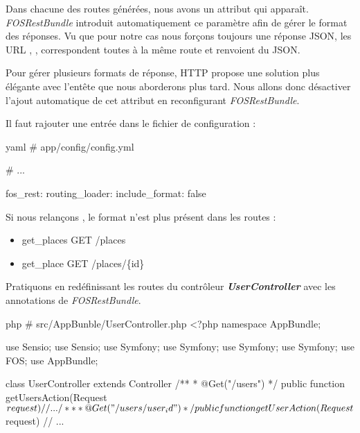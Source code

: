\documentclass[big]{zmdocument}
\begin{document}
Dans chacune des routes générées, nous avons un attribut  qui apparaît. \textit{FOSRestBundle} introduit automatiquement ce paramètre afin de gérer le format des réponses. Vu que pour notre cas nous forçons toujours une réponse JSON, les URL , ,  correspondent toutes à la même route et renvoient du JSON.



Pour gérer plusieurs formats de réponse, HTTP propose une solution plus élégante avec l'entête  que nous aborderons plus tard. Nous allons donc désactiver l'ajout automatique de cet attribut en reconfigurant \textit{FOSRestBundle}.



Il faut rajouter une entrée dans le fichier de configuration :



\begin{CodeBlock}{yaml}
# app/config/config.yml

# ...

fos_rest:
    routing_loader:
        include_format: false
\end{CodeBlock}



Si nous relançons , le format n'est plus présent dans les routes :



\begin{itemize}
\item get\_places GET /places
\item get\_place  GET /places/\{id\}
\end{itemize}


Pratiquons en redéfinissant les routes du contrôleur \textbf{\textit{UserController}} avec les annotations de \textit{FOSRestBundle}.



\begin{CodeBlock}{php}
# src/AppBunble/UserController.php
<?php
namespace AppBundle\Controller;

use Sensio\Bundle\FrameworkExtraBundle\Configuration\Route;
use Sensio\Bundle\FrameworkExtraBundle\Configuration\Method;
use Symfony\Bundle\FrameworkBundle\Controller\Controller;
use Symfony\Component\HttpFoundation\JsonResponse;
use Symfony\Component\HttpFoundation\Request;
use Symfony\Component\HttpFoundation\Response;
use FOS\RestBundle\Controller\Annotations\Get;
use AppBundle\Entity\User;

class UserController extends Controller
{
    /**
     * @Get("/users")
     */
    public function getUsersAction(Request $request)
    {
        // ...
    }

    /**
     * @Get("/users/{user_id}")
     */
    public function getUserAction(Request $request)
    {
        // ...
    }
}
\end{CodeBlock}
\end{document}
